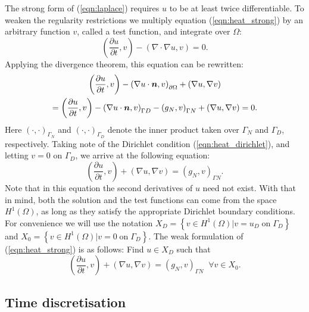The strong form of (\ref{eqn:laplace}) requires $u$ to be at least twice differentiable. To weaken the regularity restrictions we multiply equation (\ref{eqn:heat_strong}) by an arbitrary function $v$, called a test function, and integrate over $\Omega$: 
\begin{equation*}
\left( \frac{\partial u}{\partial t},v \right)  -\left(\nabla \cdot \nabla u,v \right) = 0.
\end{equation*}
Applying the divergence theorem, this equation can be rewritten:
\begin{multline*}
\left( \frac{\partial u}{\partial t},v \right)  -\left(\nabla u \cdot \boldsymbol{n} ,v \right)_{\partial \Omega}+ \left(\nabla u,\nabla v \right)\\= \left( \frac{\partial u}{\partial t},v \right)  -\left(\nabla u \cdot \boldsymbol{n} ,v \right)_{\Gamma D}-\left(g_{N} ,v \right)_{\Gamma N}+ \left(\nabla u,\nabla v \right)=0.
\end{multline*}
Here $\left(\cdot ,\cdot\right)_{\Gamma_{N}}$ and $\left(\cdot ,\cdot\right)_{\Gamma_{D}}$ denote the inner product taken over $\Gamma_{N}$ and $\Gamma_{D}$, respectively. Taking note of the Dirichlet condition (\ref{eqn:heat_dirichlet}), and letting $v = 0$ on $\Gamma_{D}$, we arrive at the following equation:
\begin{equation*}
\left( \frac{\partial u}{\partial t},v \right) + \left(\nabla u,\nabla v \right)=\left(g_{N} ,v \right)_{\Gamma N}.
\end{equation*}
Note that in this equation the second derivatives of $u$ need not exist. With that in mind, both the solution and the test functions can come from the space $H^1(\Omega)$, as long as they satisfy the appropriate Dirichlet boundary conditions. For convenience we will use the notation $X_{D}=\left\lbrace v \in H^{1}(\Omega) | v = u_{D} \;\mbox{on} \; \Gamma_{D} \right\rbrace$ and $X_{0}=\left\lbrace v \in H^{1}(\Omega) | v = 0 \;\mbox{on} \; \Gamma_{D} \right\rbrace$. The weak formulation of (\ref{eqn:heat_strong}) is as follows: Find $u\in X_{D}$ such that
\begin{equation}
\left( \frac{\partial u}{\partial t},v \right) + \left(\nabla u,\nabla v \right)=\left(g_{N} ,v \right)_{\Gamma N}\;\;\forall v \in X_{0}.
\label{eqn:heat_weak}
\end{equation}

\subsection{Time discretisation}

